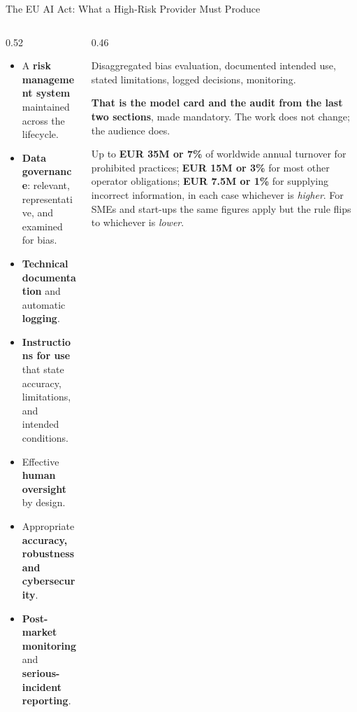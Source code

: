 \begin{frame}[allowframebreaks]{The EU AI Act: What a High-Risk Provider Must Produce}

    \begin{columns}[T]
        \begin{column}{0.52\textwidth}
            \begin{itemize}\scriptsize
                \setlength\itemsep{0.1em}
                \item A \textbf{risk management system} maintained across the lifecycle.
                \item \textbf{Data governance}: relevant, representative, and examined for bias.
                \item \textbf{Technical documentation} and automatic \textbf{logging}.
                \item \textbf{Instructions for use} that state accuracy, limitations, and intended
                      conditions.
                \item Effective \textbf{human oversight} by design.
                \item Appropriate \textbf{accuracy, robustness and cybersecurity}.
                \item \textbf{Post-market monitoring} and \textbf{serious-incident reporting}.
            \end{itemize}
        \end{column}
        \begin{column}{0.46\textwidth}
            \begin{tcolorbox}[colback=raiGreen!5, colframe=raiGreen!60,
                              title=Recognise anything?]
                \scriptsize
                Disaggregated bias evaluation, documented intended use, stated limitations,
                logged decisions, monitoring.

                \vspace{0.12em}
                \textbf{That is the model card and the audit from the last two sections}, made
                mandatory. The work does not change; the audience does.
            \end{tcolorbox}

            \vspace{0.18em}
            \begin{tcolorbox}[colback=raiRed!5, colframe=raiRed!70, title=Penalties (Article 99)]
                \scriptsize
                Up to \textbf{EUR 35M or 7\%} of worldwide annual turnover for prohibited
                practices; \textbf{EUR 15M or 3\%} for most other operator obligations;
                \textbf{EUR 7.5M or 1\%} for supplying incorrect information, in each case
                whichever is \emph{higher}. For SMEs and start-ups the same figures apply but the
                rule flips to whichever is \emph{lower}.
            \end{tcolorbox}
        \end{column}
    \end{columns}


\end{frame}
